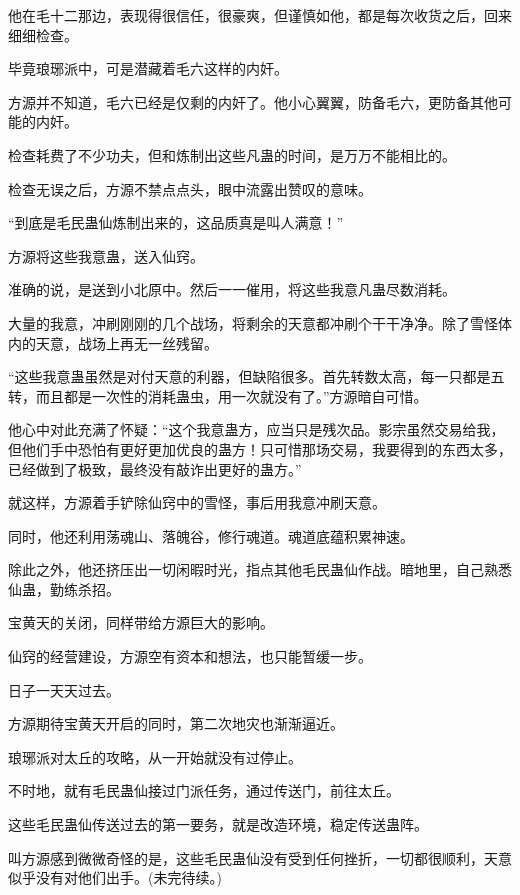 \begin{this_body}
他在毛十二那边，表现得很信任，很豪爽，但谨慎如他，都是每次收货之后，回来细细检查。

毕竟琅琊派中，可是潜藏着毛六这样的内奸。

方源并不知道，毛六已经是仅剩的内奸了。他小心翼翼，防备毛六，更防备其他可能的内奸。

检查耗费了不少功夫，但和炼制出这些凡蛊的时间，是万万不能相比的。

检查无误之后，方源不禁点点头，眼中流露出赞叹的意味。

“到底是毛民蛊仙炼制出来的，这品质真是叫人满意！”

方源将这些我意蛊，送入仙窍。

准确的说，是送到小北原中。然后一一催用，将这些我意凡蛊尽数消耗。

大量的我意，冲刷刚刚的几个战场，将剩余的天意都冲刷个干干净净。除了雪怪体内的天意，战场上再无一丝残留。

“这些我意蛊虽然是对付天意的利器，但缺陷很多。首先转数太高，每一只都是五转，而且都是一次性的消耗蛊虫，用一次就没有了。”方源暗自可惜。

他心中对此充满了怀疑：“这个我意蛊方，应当只是残次品。影宗虽然交易给我，但他们手中恐怕有更好更加优良的蛊方！只可惜那场交易，我要得到的东西太多，已经做到了极致，最终没有敲诈出更好的蛊方。”

就这样，方源着手铲除仙窍中的雪怪，事后用我意冲刷天意。

同时，他还利用荡魂山、落魄谷，修行魂道。魂道底蕴积累神速。

除此之外，他还挤压出一切闲暇时光，指点其他毛民蛊仙作战。暗地里，自己熟悉仙蛊，勤练杀招。

宝黄天的关闭，同样带给方源巨大的影响。

仙窍的经营建设，方源空有资本和想法，也只能暂缓一步。

日子一天天过去。

方源期待宝黄天开启的同时，第二次地灾也渐渐逼近。

琅琊派对太丘的攻略，从一开始就没有过停止。

不时地，就有毛民蛊仙接过门派任务，通过传送门，前往太丘。

这些毛民蛊仙传送过去的第一要务，就是改造环境，稳定传送蛊阵。

叫方源感到微微奇怪的是，这些毛民蛊仙没有受到任何挫折，一切都很顺利，天意似乎没有对他们出手。(未完待续。)

\end{this_body}

